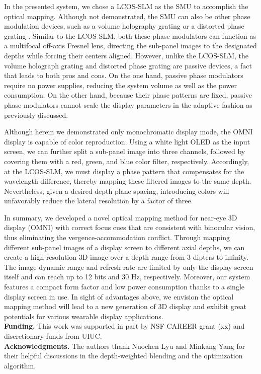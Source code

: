 \documentclass[9pt,twocolumn,twoside]{osajnl}
\begin{document}
In the presented system, we chose a LCOS-SLM as the SMU to accomplish the optical mapping. Although not demonstrated,  the SMU can also be other phase modulation devices, such as a volume holography grating \cite{sinha2004imaging}\cite{luo2010simulations} or a distorted phase grating \cite{dalgarno2010multiplane}\cite{blanchard1999simultaneous}. Similar to the LCOS-SLM, both these phase modulators can function as a multifocal off-axis Fresnel lens, directing the sub-panel images to the designated depths while forcing their centers aligned.   However, unlike the LCOS-SLM, the volume holograph grating and distorted phase grating are passive devices, a fact that leads to both pros and cons. On the one hand, passive phase modulators require no power supplies, reducing the system volume as well as the power consumption. On the other hand, because their phase patterns are fixed, passive phase modulators cannot scale the display parameters in the adaptive fashion as previously discussed.

Although herein we demonstrated only monochromatic display mode, the OMNI display is capable of color reproduction. Using a white light OLED as the input screen, we can further split a sub-panel image into three channels, followed by covering them with a red, green, and blue color filter, respectively. Accordingly, at the LCOS-SLM, we must display a phase pattern that compensates for the wavelength difference, thereby mapping these filtered images to the same depth. Nevertheless, given a desired depth plane spacing, introducing colors will unfavorably reduce the lateral resolution by a factor of three.

In summary, we developed a novel optical mapping method for near-eye 3D display (OMNI) with correct focus cues that are consistent with binocular vision, thus eliminating the vergence-accommodation conflict. Through mapping different sub-panel images of a display screen to different axial depths, we can create a high-resolution 3D image over a depth range from 3 dipters to infinity. The image dynamic range and refresh rate are limited by only the display screen itself and can reach up to 12 bits and 30 Hz, respectively. Moreover, our system features a compact form factor and low power consumption thanks to a single display screen in use.  In sight of advantages above, we envision the optical mapping method will lead to a new generation of 3D display and exhibit great potentials for various wearable display applications.\\

\textbf{Funding.} This work was supported in part by NSF CAREER grant (xx) and discretionary funds from UIUC.\\

\textbf{Acknowledgments.} The authors thank Nuochen Lyu and Minkang Yang for their helpful discussions in the depth-weighted blending and the optimization algorithm.



 
\end{document}
